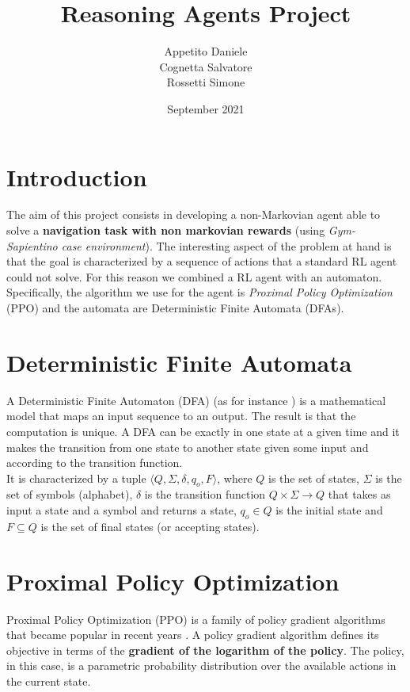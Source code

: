 \documentclass{article}
\title{Reasoning Agents Project}
\author{Appetito Daniele\\
        Cognetta Salvatore\\
        Rossetti Simone}
\date{September 2021}
\begin{document}
\maketitle

\section{Introduction}
The aim of this project consists in developing a non-Markovian agent able to solve a \textbf{navigation task with non markovian rewards} (using \textit{ Gym-Sapientino case environment}). The interesting aspect of the problem at hand is that the goal is characterized by a sequence of actions that a standard RL agent could not solve. For this reason we combined a RL agent with an automaton. Specifically, the algorithm we use for the agent is \textit{Proximal Policy Optimization} (PPO) and the automata are Deterministic Finite Automata (DFAs).

\section{Deterministic Finite Automata}
A Deterministic Finite Automaton (DFA) (as for instance \cite{dfa})
is a mathematical model that maps an input sequence to an output.  The result is that the computation is unique. A DFA can be exactly in one state at a given time and it makes the transition from one state to another state given some input and according to the transition function.\\
It is characterized by a tuple $\langle Q, \Sigma, \delta, q_o ,F \rangle$, where $Q$ is the set of states, $\Sigma$ is the set of symbols (alphabet), $\delta$  is the transition function $Q \times \Sigma \longrightarrow Q$ that takes as input a state and a symbol and returns a state, $q_o \in Q$ is the initial state and $F \subseteq Q$ is the set of final states (or accepting states).





\section{Proximal Policy Optimization}
Proximal Policy Optimization (PPO) is a family of policy gradient algorithms that became popular in recent years \cite{schulman2017proximal_PPO}. A policy gradient algorithm defines its objective in terms of the \textbf{gradient of the logarithm of the policy}. The policy, in this case, is a parametric probability distribution over the available actions in the current state.
\end{document}
